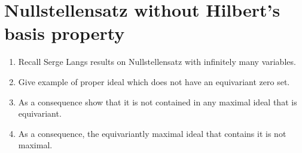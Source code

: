 %
\section{Nullstellensatz without Hilbert's basis property}
%
\begin{enumerate}
    \item Recall Serge Langs results on Nullstellensatz with infinitely many variables.
    \item Give example of proper ideal which does not have an equivariant zero set.
    \item As a consequence show that it is not contained in any maximal ideal that is equivariant.
    \item As a consequence, the equivariantly maximal ideal that contains it is not maximal.
\end{enumerate}